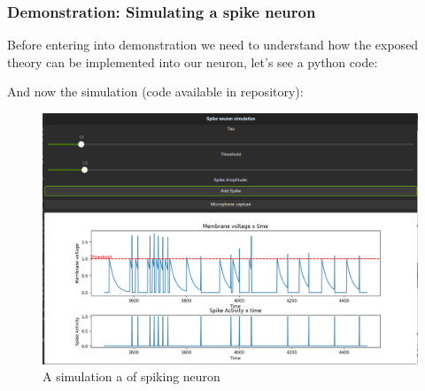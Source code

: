 \begin{frame}[allowframebreaks]
	\frametitle{Demonstration: Simulating a spike neuron}
	\par Before entering into demonstration we need to understand how the exposed theory can be implemented into our neuron, let's see a python code:
	
	
	
	\par And now the simulation (code available in repository):
	
	\begin{figure}
		\centering
		\includegraphics[width=0.6\linewidth]{images/spikeNeuronSimulation}
		\caption[Spiking Neuron Simulator]{A simulation a of spiking neuron}
		\label{fig:spikeneuronsimulation}
	\end{figure}
\end{frame}